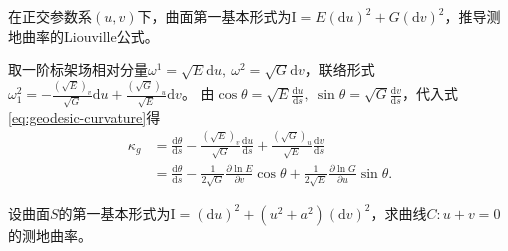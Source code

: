 \documentclass[../../main.tex]{subfiles}%
\begin{document}
\begin{example}
在正交参数系$(u,v)$下，曲面第一基本形式为$\mathrm{I}=E(\mathrm{d}u)^2+G(\mathrm{d}v)^2$，推导测地曲率的Liouville公式。
\end{example}

\begin{solution}

取一阶标架场相对分量$\omega^1=\sqrt{E}\mathrm{d}u,\ \omega^2=\sqrt{G}\mathrm{d}v$，联络形式$\omega_1^2=-\frac{(\sqrt{E})_v}{\sqrt{G}}\mathrm{d}u+\frac{(\sqrt{G})_u}{\sqrt{E}}\mathrm{d}v$。
由$\cos\theta=\sqrt{E}\frac{\mathrm{d}u}{\mathrm{d}s},\ \sin\theta=\sqrt{G}\frac{\mathrm{d}v}{\mathrm{d}s}$，代入式\eqref{eq:geodesic-curvature}得
\begin{align*}
\kappa_g&=\frac{\mathrm{d}\theta}{\mathrm{d}s}-\frac{(\sqrt{E})_v}{\sqrt{G}}\frac{\mathrm{d}u}{\mathrm{d}s}+\frac{(\sqrt{G})_u}{\sqrt{E}}\frac{\mathrm{d}v}{\mathrm{d}s}\\
&=\frac{\mathrm{d}\theta}{\mathrm{d}s}-\frac{1}{2\sqrt{G}}\frac{\partial\ln E}{\partial v}\cos\theta+\frac{1}{2\sqrt{E}}\frac{\partial\ln G}{\partial u}\sin\theta.
\end{align*}

\end{solution}

\begin{example}
设曲面$S$的第一基本形式为$\mathrm{I}=(\mathrm{d}u)^2+(u^2+a^2)(\mathrm{d}v)^2$，求曲线$C:u+v=0$的测地曲率。
\end{example}
\end{document}
